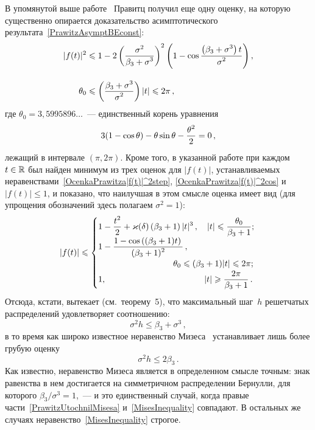 \begin{multicols}{2}
В упомянутой выше работе~\cite{Prawitz1973} Правитц получил еще одну
оценку, на которую существенно опирается доказательство
асимптотического результата~\eqref{PrawitzAsymptBEconst}:
\begin{align}
|f(t)|^2 & \leqslant 1- 2 \left(\displaystyle\frac{\displaystyle \sigma^2\mathstrut}{\displaystyle \beta_3+\sigma^3\mathstrut}\right)^2
\left(1-\cos\displaystyle\frac{\displaystyle \left(\beta_3+ \sigma^3\right)t\mathstrut}{\displaystyle \sigma^2\mathstrut}
\right),\notag\\
&\label{OcenkaPrawitza|f(t)|^2cos} \\[-6pt]
\theta_0 &\leqslant \left(\displaystyle\frac{\displaystyle \beta_3+\sigma^3\mathstrut}{\displaystyle \sigma^2\mathstrut}\right)|t| \leqslant 2\pi\,,\notag
\end{align}
где $\theta_0=3{,}5995896\ldots$~--- единственный корень уравнения
$$
3(1-\cos\theta)-\theta\sin\theta-\displaystyle\frac{\displaystyle \theta^2\mathstrut}{\displaystyle 2\mathstrut}=0\,,
$$
лежащий в интервале $(\pi,2\pi)$. Кроме того, в указанной работе при
каждом $t\in\mathbb R$ был найден минимум из трех оценок для $|f(t)|$,
устанавливаемых неравенствами~\eqref{OcenkaPrawitza|f(t)|^2step},
\eqref{OcenkaPrawitza|f(t)|^2cos} и $|f(t)|\le1$, и показано, что
наилучшая в этом смысле оценка имеет вид (для упрощения обозначений
здесь полагаем $\sigma^2=1$):
$$
|f(t)|\le
\begin{cases}
1-\fr{t^2}2+\varkappa(\d)\left(\beta_3+
 1\right)|t|^3\,,\hspace*{10pt}   |t|\le\fr{\theta_0}{\beta_3+1};\hspace*{-8pt} \\
1-\fr{1-\cos\left((\beta_3+1) t\right)}
 {(\beta_3+1)^2}\, , \\
\hspace*{88pt} \theta_0\le (\beta_3+1)|t|  \le 2\pi;\hspace*{-8pt} \\
    1, \hspace*{115pt} |t|\ge\fr{2\pi}{\beta_3+1}\,.\hspace*{-8pt}
\end{cases}
$$
Отсюда, кстати, вытекает  (см.\ теорему~5), что
максимальный шаг~$h$ решетчатых распределений
удов\-ле\-тво\-ря\-ет соотношению:
\begin{equation}
\label{PrawitzUtochnilMisesa}
\sigma^2h\le \beta_3+\sigma^3\,,
\end{equation}
в то время как широко известное неравенство Мизеса~\cite{Mises1939}
устанавливает лишь более грубую оценку
\begin{equation}
\label{MisesInequality}
\sigma^2h\le 2\beta_3\,.
\end{equation}
Как известно, неравенство Мизеса является в определенном смысле
точным: знак равенства в нем достигается на симметричном
распределении Бернулли, для которого $\beta_3/\sigma^3=1$,~--- и это
единственный случай, когда правые
части~\eqref{PrawitzUtochnilMisesa} и~\eqref{MisesInequality}
совпадают.
В остальных же случаях неравенство~\eqref{MisesInequality} строгое.


\end{multicols}
